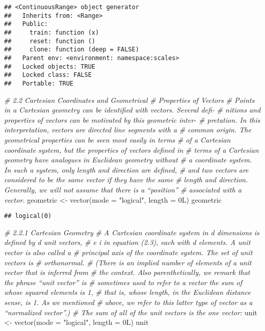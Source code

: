 \documentclass[
]{article}
\newenvironment{Shaded}{\begin{snugshade}}{\end{snugshade}}
\newcommand{\AttributeTok}[1]{\textcolor[rgb]{0.77,0.63,0.00}{#1}}
\newcommand{\CommentTok}[1]{\textcolor[rgb]{0.56,0.35,0.01}{\textit{#1}}}
\newcommand{\FunctionTok}[1]{\textcolor[rgb]{0.00,0.00,0.00}{#1}}
\newcommand{\NormalTok}[1]{#1}
\newcommand{\OtherTok}[1]{\textcolor[rgb]{0.56,0.35,0.01}{#1}}
\newcommand{\StringTok}[1]{\textcolor[rgb]{0.31,0.60,0.02}{#1}}
\begin{document}
\begin{verbatim}
## <ContinuousRange> object generator
##   Inherits from: <Range>
##   Public:
##     train: function (x) 
##     reset: function () 
##     clone: function (deep = FALSE) 
##   Parent env: <environment: namespace:scales>
##   Locked objects: TRUE
##   Locked class: FALSE
##   Portable: TRUE
\end{verbatim}

\begin{Shaded}
\begin{Highlighting}[]
\CommentTok{\# 2.2 Cartesian Coordinates and Geometrical}
\CommentTok{\# Properties of Vectors}
\CommentTok{\# Points in a Cartesian geometry can be identiﬁed with vectors. Several deﬁ{-}}
\CommentTok{\# nitions and properties of vectors can be motivated by this geometric inter{-}}
\CommentTok{\# pretation. In this interpretation, vectors are directed line segments with a}
\CommentTok{\# common origin. The geometrical properties can be seen most easily in terms}
\CommentTok{\# of a Cartesian coordinate system, but the properties of vectors deﬁned in}
\CommentTok{\# terms of a Cartesian geometry have analogues in Euclidean geometry without}
\CommentTok{\# a coordinate system. In such a system, only length and direction are deﬁned,}
\CommentTok{\# and two vectors are considered to be the same vector if they have the same}
\CommentTok{\# length and direction. Generally, we will not assume that there is a “position”}
\CommentTok{\# associated with a vector.}
\NormalTok{geometric }\OtherTok{\textless{}{-}} \FunctionTok{vector}\NormalTok{(}\AttributeTok{mode =} \StringTok{"logical"}\NormalTok{, }\AttributeTok{length =}\NormalTok{ 0L)}
\NormalTok{geometric}
\end{Highlighting}
\end{Shaded}

\begin{verbatim}
## logical(0)
\end{verbatim}

\begin{Shaded}
\begin{Highlighting}[]
\CommentTok{\# 2.2.1 Cartesian Geometry}
\CommentTok{\# A Cartesian coordinate system in d dimensions is deﬁned by d unit vectors,}
\CommentTok{\# e i in equation (2.3), each with d elements. A unit vector is also called a}
\CommentTok{\# principal axis of the coordinate system. The set of unit vectors is }
\CommentTok{\# orthonormal.}
\CommentTok{\# (There is an implied number of elements of a unit vector that is inferred from}
\CommentTok{\# the context. Also parenthetically, we remark that the phrase “unit vector” is}
\CommentTok{\# sometimes used to refer to a vector the sum of whose squared elements is 1,}
\CommentTok{\# that is, whose length, in the Euclidean distance sense, is 1. As we mentioned}
\CommentTok{\# above, we refer to this latter type of vector as a “normalized vector”.)}
\CommentTok{\# The sum of all of the unit vectors is the one vector:}
\NormalTok{unit }\OtherTok{\textless{}{-}} \FunctionTok{vector}\NormalTok{(}\AttributeTok{mode =} \StringTok{"logical"}\NormalTok{, }\AttributeTok{length =}\NormalTok{ 0L)}
\NormalTok{unit}
\end{Highlighting}
\end{Shaded}
\end{document}
